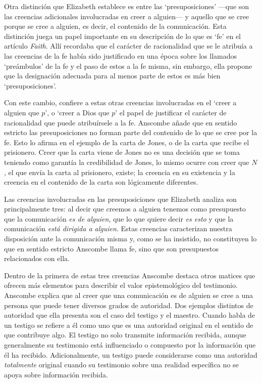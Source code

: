 Otra distinción que Elizabeth establece es entre las `presuposiciones' ---que son las creencias adicionales involucradas en creer a alguien--- y aquello que se cree porque se cree a alguien, es decir, el contenido de la comunicación. Esta distinción juega un papel importante en su descripción de lo que es `fe' en el artículo \emph{Faith}. Allí recordaba que el carácter de racionalidad que se le atribuía a las creencias de la fe había sido justificado en una época sobre los llamados `preámbulos' de la fe y el paso de estos a la fe misma, sin embargo, ella propone que la designación adecuada para al menos parte de estos es más bien `presuposiciones'.

Con este cambio, confiere a estas otras creencias involucradas en el `creer a alguien que $p$', o `creer a Dios que $p$' el papel de justificar el carácter de racionalidad que puede atribuírsele a la fe. Anscombe añade que en sentido estricto las presuposiciones no forman parte del contenido de lo que se cree por la fe. Esto lo afirma en el ejemplo de la carta de Jones, o de la carta que recibe el prisionero. Creer que la carta viene de Jones no es una decisión que se toma teniendo como garantía la credibilidad de Jones, lo mismo ocurre con creer que $N$, el que envía la carta al prisionero, existe; la creencia en su existencia y la creencia en el contenido de la carta son lógicamente diferentes.

Las creencias involucradas en las presuposiciones que Elizabeth analiza son principalmente tres: al decir que creemos a alguien tenemos como presupuesto que la comunicación \emph{es de alguien}, que lo que quiere decir \emph{es esto} y que la comunicación \emph{está dirigida a alguien}. Estas creencias caracterizan nuestra disposición ante la comunicación misma y, como se ha insistido, no constituyen lo que en sentido estricto Anscombe llama fe, sino que son presupuestos relacionados con ella.

Dentro de la primera de estas tres creencias Anscombe destaca otros matices que ofrecen más elementos para describir el valor epistemológico del testimonio. Anscombe explica que al creer que una comunicación es de alguien se cree a una persona que puede tener diversos grados de autoridad. Dos ejemplos distintos de autoridad que ella presenta son el caso del testigo y el maestro. Cuando habla de un testigo se refiere a él como uno que es una autoridad original en el sentido de que contribuye algo. El testigo no solo transmite información recibida, aunque generalmente su testimonio está influenciado o compuesto por la información que él ha recibido. Adicionalmente, un testigo puede considerarse como una autoridad \emph{totalmente} original cuando su testimonio sobre una realidad específica no se apoya sobre información recibida.

